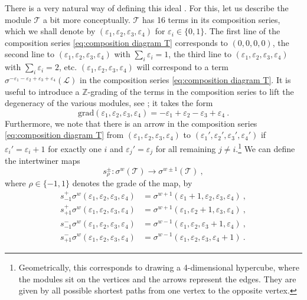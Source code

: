 \documentclass[12pt,a4paper]{article}
\newcommand{\be}{\begin{equation}}
\newcommand{\ee}{\end{equation}}
\begin{document}
There is a very natural way of defining this ideal \cite{Gaberdiel:2011vf}. For this, let us describe the module $\mathscr{T}$ a bit more conceptually. $\mathscr{T}$ has 16 terms in its composition series, which we shall denote by $(\varepsilon_1,\varepsilon_2,\varepsilon_3,\varepsilon_4)$ for $\varepsilon_i \in \{0,1\}$. The first line of the composition series \eqref{eq:composition diagram T} corresponds to $(0,0,0,0)$, the second line to $(\varepsilon_1,\varepsilon_2,\varepsilon_3,\varepsilon_4)$ with $\sum_i \varepsilon_i=1$, the third line to $(\varepsilon_1,\varepsilon_2,\varepsilon_3,\varepsilon_4)$ with $\sum_i \varepsilon_i=2$, etc. $(\varepsilon_1,\varepsilon_2,\varepsilon_3,\varepsilon_4)$ will correspond to a term $\sigma^{-\varepsilon_1-\varepsilon_2+\varepsilon_3+\varepsilon_4}(\mathscr{L})$ in the composition series \eqref{eq:composition diagram T}. It is useful to introduce a $\mathds{Z}$-grading of the terms in the composition series to lift the degeneracy of the various modules, see \cite{Gaberdiel:2011vf}; it takes the form 
\be 
\mathrm{grad}(\varepsilon_1,\varepsilon_2,\varepsilon_3,\varepsilon_4)=-\varepsilon_1+\varepsilon_2-\varepsilon_3+\varepsilon_4\ .
\ee
Furthermore, we note that there is an arrow in the composition series \eqref{eq:composition diagram T} from $(\varepsilon_1,\varepsilon_2,\varepsilon_3,\varepsilon_4)$ to $(\varepsilon_1',\varepsilon_2',\varepsilon_3',\varepsilon_4')$ if $\varepsilon_i'=\varepsilon_i+1$ for exactly one $i$ and $\varepsilon_j'=\varepsilon_j$ for all remaining $j \ne i$.\footnote{Geometrically, this corresponds to drawing a 4-dimensional hypercube, where the modules sit on the vertices and the arrows represent the edges. They are given by all possible shortest paths from one vertex to the opposite vertex.} We can define the intertwiner maps 
\be 
s^\pm_{\rho}: \sigma^w(\mathscr{T}) \to \sigma^{w\pm 1}(\mathscr{T})\ ,
\ee
where $\rho\in \{-1,1\}$ denotes the grade of the map, by
\begin{subequations}
\begin{align}
s^+_{-1}\sigma^w(\varepsilon_1,\varepsilon_2,\varepsilon_3,\varepsilon_4)&=\sigma^{w+1}(\varepsilon_1+1,\varepsilon_2,\varepsilon_3,\varepsilon_4)\ , \\
s^+_{+1}\sigma^w(\varepsilon_1,\varepsilon_2,\varepsilon_3,\varepsilon_4)&=\sigma^{w+1}(\varepsilon_1,\varepsilon_2+1,\varepsilon_3,\varepsilon_4)\ , \\
s^-_{-1}\sigma^w(\varepsilon_1,\varepsilon_2,\varepsilon_3,\varepsilon_4)&=\sigma^{w-1}(\varepsilon_1,\varepsilon_2,\varepsilon_3+1,\varepsilon_4)\ , \\
s^-_{+1}\sigma^w(\varepsilon_1,\varepsilon_2,\varepsilon_3,\varepsilon_4)&=\sigma^{w-1}(\varepsilon_1,\varepsilon_2,\varepsilon_3,\varepsilon_4+1)\ .
\end{align}
\end{subequations}
\end{document}
